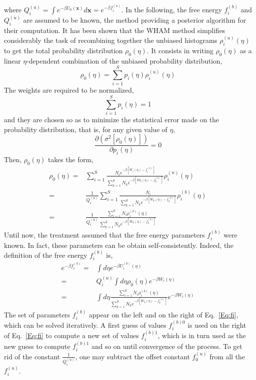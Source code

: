 where $Q_{i}^{(u)}=\int e^{-\beta U_{0}(\textbf{x})} d\textbf{x}=e^{-\beta f_{i}^{(u)}}$.
In the following, the free energy $f_{i}^{(b)}$ and $Q_{i}^{(u)}$ are assumed to be known, the method providing a posterior algorithm for their computation.
It has been shown that the WHAM method simplifies considerably the task of recombining together the unbiased histograms $\rho_{i}^{(u)}(\eta)$ to get the total probability distribution $\rho_{0}(\eta)$. It consists in writing $\rho_{0}(\eta)$ as a linear $\eta$-dependent combination of the unbiased probability distribution,
\begin{equation}
\rho_{0}(\eta)=\sum_{i=1}^{S}p_{i}(\eta)\rho_{i}^{(u)}(\eta)
\label{Eq:unbias0}
\end{equation}  
The weights are required to be normalized,
\begin{equation}
\sum_{i=1}^{S}p_{i}(\eta)=1
\label{Eq:p1}
\end{equation}
and they are chosen so as to minimize the statistical error made on the probability distribution, that is, for any given value of $\eta$,
\begin{equation}
\frac{\partial(\sigma^2[\rho_{0}(\eta)])}{\partial p_{i}(\eta)}=0
\label{Eq:partialp}
\end{equation} 
Then, $\rho_{0}(\eta)$ takes the form,
\begin{align}
\rho_{0}(\eta) = & \sum_{i=1}^{S}\frac{N_{i}e^{-\beta[W_{i}(\eta)-f_{i}^{(b)}]}}{\sum_{k=1}^{S}N_{k}e^{-\beta[W_{k}(\eta)-f_{k}^{(b)}]}}\rho_{i}^{(u)}(\eta) \\
= & \frac{1}{Q_{i}^{(u)}}\sum_{i=1}^{S}\frac{N_{i}}{\sum_{k=1}^{S}N_{k}e^{-\beta[W_{k}(\eta)-f_{k}^{(b)}]}}\rho_{i}^{(b)}(\eta) \\
= & \frac{1}{Q_{i}^{(u)}}\frac{\sum_{i=1}^{S}N_{i}\rho_{i}^{(b)}(\eta)}{\sum_{k=1}^{S}N_{k}e^{-\beta[W_{k}(\eta)-f_{k}^{(b)}]}}
\label{Eq:unbias02}
\end{align} 
Until now, the treatment assumed that the free energy parameters ${f_{i}^{(b)}}$ were known. In fact, these parameters can be obtain self-consistently. Indeed, the definition of the free energy $f_{i}^{(b)}$ is,
\begin{align}
e^{-\beta f_{i}^{(b)}}=&\int d\eta e^{-\beta U_{i}^{(b)}(\eta) } \\
=&Q_{i}^{(u)}\int d\eta \rho_{0}(\eta) e^{-\beta W_{i}(\eta)} \\
=&\int d\eta \frac{\sum_{i=1}^{S}N_{i}\rho_{i}^{(b)}(\eta)}{\sum_{k=1}^{S}N_{k}e^{-\beta[W_{k}(\eta)-f_{k}^{(b)}]}}e^{-\beta W_{i}(\eta)} 
\label{Eq:fi}
\end{align} 
The set of parameters ${f_{i}^{(b)}}$ appear on the left and on the right of Eq.~\ref{Eq:fi}, which can be solved iteratively. A first guess of values ${f_{i}^{(b)0}}$ is used on the right of Eq.~\ref{Eq:fi} to compute a new set of values ${f_{i}^{(b)1}}$, which is in turn used as the new guess to compute ${f_{i}^{(b)1}}$ and so on until convergence of the process. To get rid of the constant $\frac{1}{Q_{i}^{(u)}}$, one may subtract the offset constant $f_{0}^{(u)}$ from all the $f_{i}^{(u)}$. 